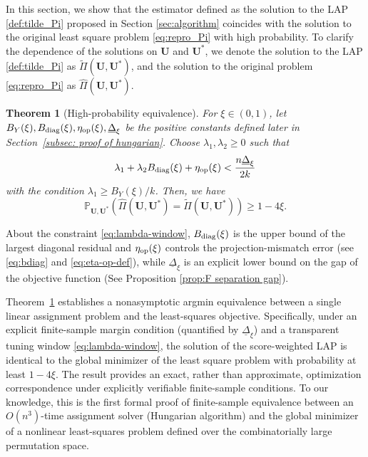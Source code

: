 \documentclass[11pt, reqno]{amsart}
\newcommand{\bP}{\mathbb{P}}
\renewcommand{\tilde}{\widetilde}
\renewcommand{\hat}{\widehat}
\renewcommand{\ge}{\geqslant}
\newcommand{\1}{\mbox{1}\hspace{-0.25em}\mbox{l}}
\theoremstyle{definition}\newtheorem{problem}{Problem}[section]
\theoremstyle{definition}\newtheorem{definition}[problem]{Definition}
\theoremstyle{remark}\newtheorem{assumption}{Assumption}
\theoremstyle{remark}\newtheorem{remark}[problem]{Remark}
\theoremstyle{definition}\newtheorem{example}[problem]{Example}
\theoremstyle{plain}\newtheorem{theorem}[problem]{Theorem}
\theoremstyle{plain}\newtheorem{question}[problem]{Question}
\theoremstyle{plain}\newtheorem{lemma}[problem]{Lemma}
\theoremstyle{plain}\newtheorem{proposition}[problem]{Proposition}
\theoremstyle{plain}\newtheorem{corollary}[problem]{Corollary}
\theoremstyle{plain}\newtheorem{conjecture}[problem]{Conjecture}
\begin{document}
In this section, we show that the estimator defined as the solution to the LAP \eqref{def:tilde_Pi} proposed in Section \ref{sec:algorithm} 
coincides with the solution to the original least square problem \eqref{eq:repro_Pi} with high probability. 
To clarify the dependence of the solutions on $\bm{U}$ and $\bm{U}^*$, we denote the solution to the LAP \eqref{def:tilde_Pi} as $\tilde{\Pi}(\bm{U}, \bm{U}^*)$, and the solution to the original problem \eqref{eq:repro_Pi} as $\hat{\Pi}(\bm{U}, \bm{U}^*)$.



\begin{theorem}[High-probability equivalence]\label{thm:high-probability equivalence}
For $\xi \in (0,1)$, let $B_Y(\xi), B_{\rm diag}(\xi), \eta_{\rm op}(\xi), \underline\Delta_\xi$ be the positive constants defined later in Section~\ref{subsec: proof of hungarian}.
Choose $\lambda_1,\lambda_2\ge 0$ such that
\begin{equation}\label{eq:lambda-window}
\lambda_1+\lambda_2 B_{\rm diag}(\xi) + \eta_{\rm op}(\xi)
 < \frac{n \underline\Delta_\xi}{2k}
\end{equation}
with the condition $\lambda_1\ge B_Y(\xi)/k$.
Then, we have
\begin{equation}
    \bP_{\bm{U}, \bm{U}^*}\left(\hat{\Pi}(\bm{U}, \bm{U}^*) = \tilde{\Pi}(\bm{U}, \bm{U}^*) \right) \ge 1 - 4\xi.
\end{equation}
\end{theorem}


About the constraint \eqref{eq:lambda-window}, $B_{\rm diag}(\xi)$ is the upper bound of the largest diagonal residual and $\eta_{\rm op}(\xi)$
controls the projection-mismatch error (see \eqref{eq:bdiag} and \eqref{eq:eta-op-def}),
while $\underline\Delta_\xi$ is an explicit lower bound on the gap of the objective function
(See Proposition \ref{prop:F separation gap}). 


Theorem~\ref{thm:high-probability equivalence} establishes a nonasymptotic argmin equivalence between a single linear assignment problem and the least-squares objective. Specifically, under an explicit finite-sample margin condition (quantified by $\underline{\Delta}_\xi$) and a transparent tuning window \eqref{eq:lambda-window}, the solution of the score-weighted LAP is identical to the global minimizer of the least square problem with probability at least $1-4\xi$.
The result provides an exact, rather than approximate, optimization correspondence under explicitly verifiable finite-sample conditions.
To our knowledge, this is the first formal proof of finite-sample equivalence between an $O(n^3)$-time assignment solver (Hungarian algorithm) and the global minimizer of a nonlinear least-squares problem defined over the combinatorially large permutation space.
\end{document}

